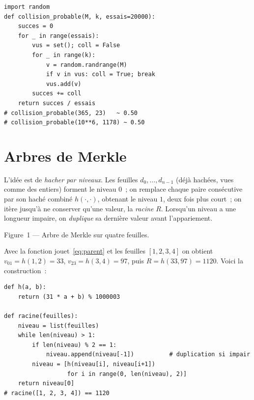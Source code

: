 \documentclass[11pt,a4paper]{article}
\theoremstyle{definition}\newtheorem{definition}{Définition}
\theoremstyle{plain}\newtheorem{theoreme}{Théorème}\newtheorem{proposition}{Proposition}\newtheorem{lemme}{Lemme}
\theoremstyle{remark}\newtheorem{remarque}{Remarque}
\begin{document}
\begin{lstlisting}
import random
def collision_probable(M, k, essais=20000):
    succes = 0
    for _ in range(essais):
        vus = set(); coll = False
        for _ in range(k):
            v = random.randrange(M)
            if v in vus: coll = True; break
            vus.add(v)
        succes += coll
    return succes / essais
# collision_probable(365, 23)   ~ 0.50
# collision_probable(10**6, 1178) ~ 0.50
\end{lstlisting}

\section{Arbres de Merkle}

L'idée est de \emph{hacher par niveaux}. Les feuilles $d_0, \dots, d_{n-1}$ (déjà hachées, vues
comme des entiers) forment le niveau $0$~; on remplace chaque paire consécutive par son haché
combiné $h(\cdot,\cdot)$, obtenant le niveau $1$, deux fois plus court~; on itère jusqu'à ne
conserver qu'une valeur, la \emph{racine} $R$. Lorsqu'un niveau a une longueur impaire, on
\emph{duplique} sa dernière valeur avant l'appariement.

\begin{center}
\end{center}
\begin{center}\small Figure~1 --- Arbre de Merkle sur quatre feuilles.\end{center}

Avec la fonction jouet~\eqref{eq:parent} et les feuilles $[1,2,3,4]$ on obtient
$v_{01}=h(1,2)=33$, $v_{23}=h(3,4)=97$, puis $R=h(33,97)=1120$. Voici la construction~:

\begin{lstlisting}
def h(a, b):
    return (31 * a + b) % 1000003

def racine(feuilles):
    niveau = list(feuilles)
    while len(niveau) > 1:
        if len(niveau) % 2 == 1:
            niveau.append(niveau[-1])          # duplication si impair
        niveau = [h(niveau[i], niveau[i+1])
                  for i in range(0, len(niveau), 2)]
    return niveau[0]
# racine([1, 2, 3, 4]) == 1120
\end{lstlisting}
\end{document}
